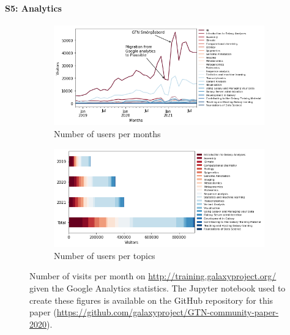 \documentclass[10pt,letterpaper]{article}
\begin{document}
\paragraph{S5: Analytics}
\begin{figure}[!ht]
    \centering
    \begin{subfigure}[b]{0.45\textwidth}
         \centering
         \includegraphics[width=\textwidth]{images/analytics-all-users.png}
         \caption{Number of users per months}
         \label{fig:analytics-all-users}
    \end{subfigure}
    \hfill
    \begin{subfigure}[b]{0.45\textwidth}
         \centering
         \includegraphics[width=\textwidth]{images/analytics-topics-users.png}
         \caption{Number of users per topics}
         \label{fig:analytics-topics-users}
    \end{subfigure}
	\caption{Number of visits per month on \url{http://training.galaxyproject.org/} given the Google Analytics statistics. The Jupyter notebook used to create these figures is available on the GitHub repository for this paper (\url{https://github.com/galaxyproject/GTN-community-paper-2020}).}
	\label{fig:visits}
\end{figure}
\end{document}

